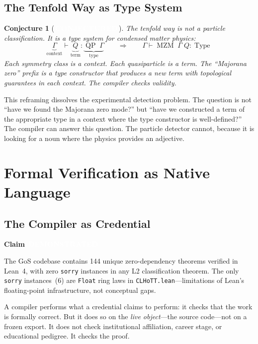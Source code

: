 \documentclass[11pt,letterpaper]{article}
\newcommand{\demonstrated}{\texorpdfstring{\colorbox{demonstrated}{\textcolor{white}{\scriptsize\textbf{\,DEMONSTRATED\,}}}}{ [DEMONSTRATED]}}
\newcommand{\conjectured}{\texorpdfstring{\colorbox{conjectured}{\textcolor{white}{\scriptsize\textbf{\,CONJECTURED\,}}}}{ [CONJECTURED]}}
\newtheorem{conjecture}[theorem]{Conjecture}
\newenvironment{claim}[1]{%
  \par\medskip\noindent\textbf{Claim} #1\quad\itshape
}{%
  \par\medskip
}
\newcommand{\MZM}{\operatorname{MZM}}
\newcommand{\QP}{\operatorname{QP}}
\newcommand{\Type}{\operatorname{Type}}
\begin{document}
\subsection{The Tenfold Way as Type System}

\begin{conjecture}[\conjectured]\label{conj:tenfold-type}
The tenfold way is not a particle classification. It is a \emph{type system} for condensed matter physics:
\[
  \underbrace{\Gamma}_{\text{context}} \vdash \underbrace{Q}_{\text{term}} : \underbrace{\QP\;\Gamma}_{\text{type}} \qquad\Longrightarrow\qquad
  \Gamma \vdash \MZM\;\Gamma\;Q : \Type
\]
Each symmetry class is a \emph{context}. Each quasiparticle is a \emph{term}. The ``Majorana zero'' prefix is a \emph{type constructor} that produces a new term with topological guarantees in each context. The compiler checks validity.
\end{conjecture}

This reframing dissolves the experimental detection problem. The question is not ``have we found the Majorana zero mode?'' but ``have we constructed a term of the appropriate type in a context where the type constructor is well-defined?'' The compiler can answer this question. The particle detector cannot, because it is looking for a noun where the physics provides an adjective.


\section{Formal Verification as Native Language}

\subsection{The Compiler as Credential}

\begin{claim}{\demonstrated}
The GoS codebase contains 144 unique zero-dependency theorems verified in Lean~4, with zero \texttt{sorry} instances in any L2 classification theorem. The only \texttt{sorry} instances~(6) are \texttt{Float} ring laws in \texttt{CLHoTT.lean}---limitations of Lean's floating-point infrastructure, not conceptual gaps.
\end{claim}

A compiler performs what a credential claims to perform: it checks that the work is formally correct. But it does so on the \emph{live object}---the source code---not on a frozen export. It does not check institutional affiliation, career stage, or educational pedigree. It checks the proof.
\end{document}

